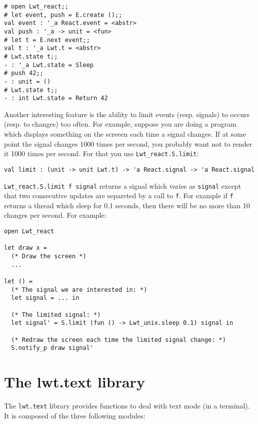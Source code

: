 \lstset{language=[Objective]Caml}\begin{lstlisting}
# open Lwt_react;;
# let event, push = E.create ();;
val event : '_a React.event = <abstr>
val push : '_a -> unit = <fun>
# let t = E.next event;;
val t : '_a Lwt.t = <abstr>
# Lwt.state t;;
- : '_a Lwt.state = Sleep
# push 42;;
- : unit = ()
# Lwt.state t;;
- : int Lwt.state = Return 42

\end{lstlisting}
Another interesting feature is the ability to limit events
(resp. signals) to occurs (resp. to changes) too often. For example,
suppose you are doing a program which displays something on the screeen
each time a signal changes. If at some point the signal changes 1000
times per second, you probably want not to render it 1000 times per
second. For that you use {\tt Lwt\_react.S.limit}:



\lstset{language=[Objective]Caml}\begin{lstlisting}
val limit : (unit -> unit Lwt.t) -> 'a React.signal -> 'a React.signal

\end{lstlisting}
{\tt Lwt\_react.S.limit f signal} returns a signal which varies as
{\tt signal} except that two consecutive updates are separeted by a
call to {\tt f}. For example if {\tt f} returns a thread which sleep
for 0.1 seconds, then there will be no more than 10 changes per
second. For example:



\lstset{language=[Objective]Caml}\begin{lstlisting}
open Lwt_react

let draw x =
  (* Draw the screen *)
  ...

let () =
  (* The signal we are interested in: *)
  let signal = ... in

  (* The limited signal: *)
  let signal' = S.limit (fun () -> Lwt_unix.sleep 0.1) signal in

  (* Redraw the screen each time the limited signal change: *)
  S.notify_p draw signal'

\end{lstlisting}
\section{ The lwt.text library }

The {\tt lwt.text} library provides functions to deal with text
mode (in a terminal). It is composed of the three following modules:



